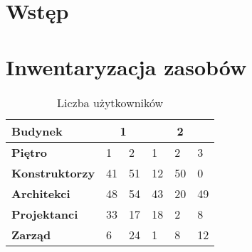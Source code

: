 \documentclass{article}
\begin{document}


\newpage
\section{Wstęp}

\newpage
\section{Inwentaryzacja zasobów}

\begin{table}[H]
	\centering
	\caption{Liczba użytkowników}
	\begin{tabular}{|l|l|l|l|l|l}
		\hline
		\textbf{Budynek}       & \multicolumn{2}{c|}{1} & \multicolumn{3}{c|}{2}            \\ \hline
		\textbf{Piętro}        & 1          & 2         & 1  & 2  & \multicolumn{1}{l|}{3}  \\ \hline
		\textbf{Konstruktorzy} & 41         & 51        & 12 & 50 & \multicolumn{1}{l|}{0}  \\ \hline
		\textbf{Architekci}    & 48         & 54        & 43 & 20 & \multicolumn{1}{l|}{49} \\ \hline
		\textbf{Projektanci}   & 33         & 17        & 18 & 2  & \multicolumn{1}{l|}{8}  \\ \hline
		\textbf{Zarząd}        & 6          & 24        & 1  & 8  & \multicolumn{1}{l|}{12} \\ \hline
	\end{tabular}
\end{table}
\end{document}
